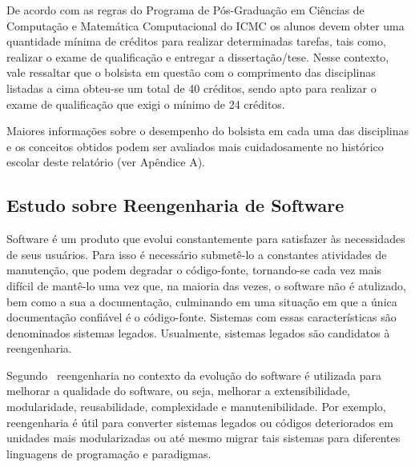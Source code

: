 De acordo com as regras do Programa de Pós-Graduação em Ciências de Computação e Matemática Computacional do ICMC os alunos devem obter uma quantidade mínima de créditos para realizar determinadas tarefas, tais como, realizar o exame de qualificação e entregar a dissertação/tese. Nesse contexto, vale ressaltar que o bolsista em questão com o comprimento das disciplinas listadas a cima obteu-se um total de 40 créditos, sendo apto para realizar o exame de qualificação que exigi o mínimo de 24 créditos.%

Maiores informações sobre o desempenho do bolsista em cada uma das disciplinas e os conceitos obtidos podem ser avaliados mais cuidadosamente no histórico escolar deste relatório (ver Apêndice A).


\subsection{Estudo sobre Reengenharia de Software} %
\label{sub:reengenharia}


Software é um produto que evolui constantemente para satisfazer às necessidades de seus usuários. Para isso é necessário submetê-lo a constantes atividades de manutenção, que podem degradar o código-fonte, tornando-se cada vez mais difícil de mantê-lo uma vez que, na maioria das vezes, o software não é atulizado, bem como a sua a documentação, culminando em uma situação em que a única documentação confiável é o código-fonte. Sistemas com essas características são denominados sistemas legados. Usualmente, sistemas legados são candidatos à reengenharia.


Segundo~\citet{refactImpro} reengenharia no contexto da evolução do software é utilizada para melhorar a qualidade do software, ou seja, melhorar a extensibilidade, modularidade, reusabilidade, complexidade e manutenibilidade. Por exemplo, reengenharia é útil para converter sistemas legados ou códigos deteriorados em unidades mais modularizadas ou até mesmo migrar tais sistemas para diferentes linguagens de programação e paradigmas.


